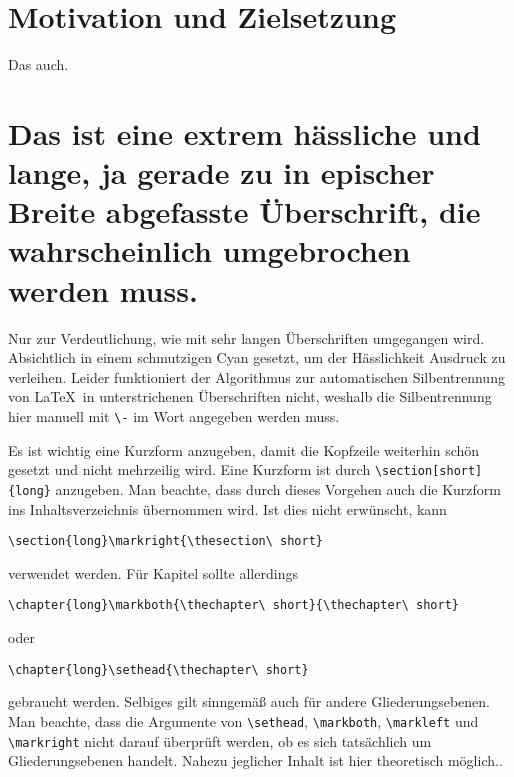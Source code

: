 \section{Motivation und Zielsetzung}
Das auch.

\color{cyan!50!blue}
\section{Das ist eine extrem hässliche und lange, ja gerade zu in epischer
Breite ab\-ge\-fasste Über\-schrift, die wahrscheinlich umgebrochen werden
muss.}
Nur zur Verdeutlichung, wie mit sehr langen Überschriften umgegangen wird.
Absichtlich in einem schmutzigen Cyan gesetzt, um der Hässlichkeit Ausdruck zu
verleihen. Leider funktioniert der Algorithmus zur automatischen Silbentrennung
von \LaTeX\ in unterstrichenen Überschriften nicht, weshalb die Silbentrennung
hier manuell mit \verb|\-| im Wort angegeben werden muss.

Es ist wichtig eine Kurzform anzugeben, damit die Kopfzeile weiterhin schön
gesetzt und nicht mehrzeilig wird. Eine Kurzform ist durch
\verb|\section[short]{long}| anzugeben. Man beachte, dass durch dieses Vorgehen
auch die Kurzform ins Inhaltsverzeichnis übernommen wird. Ist dies nicht
erwünscht, kann

\verb|\section{long}\markright{\thesection\ short}|

\noindent
verwendet werden. Für Kapitel sollte allerdings

\verb|\chapter{long}\markboth{\thechapter\ short}{\thechapter\ short}|

\noindent
oder 

\verb|\chapter{long}\sethead{\thechapter\ short}|

\noindent
gebraucht werden. Selbiges gilt sinngemäß auch für andere Gliederungsebenen. Man
beachte, dass die Argumente von \verb|\sethead|, \verb|\markboth|,
\verb|\markleft| und \verb|\markright| nicht darauf überprüft werden, ob es
sich tatsächlich um Gliederungsebenen handelt. Nahezu jeglicher Inhalt ist hier
theoretisch möglich..
\endgroup
